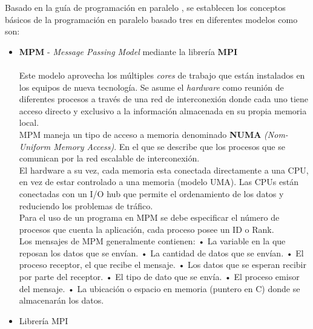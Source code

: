 Basado en la guía de programación en paralelo \cite{acosta2012guia}, se establecen los conceptos básicos de la programación en paralelo basado tres en diferentes modelos como son:

\begin{itemize}
	\item \textbf{MPM} - \textit{Message Passing Model} mediante la librería \textbf{MPI}
	\\\\
	Este modelo aprovecha los múltiples \textit{cores} de trabajo que están instalados en los equipos de nueva tecnología. Se asume el \textit{hardware} como reunión de diferentes procesos a través de una red de interconexión donde cada uno tiene acceso directo y exclusivo a la información almacenada en su propia memoria local.\\
	
	MPM maneja un tipo de acceso a memoria denominado \textbf{NUMA} \textit{(Nom-Uniform Memory Access)}. En el que se describe que los procesos que se comunican por la red escalable de interconexión.\\
	El hardware a su vez, cada memoria esta conectada directamente a una CPU, en vez de estar controlado a una memoria (modelo UMA). Las CPUs están conectadas con un I/O hub que permite el ordenamiento de los datos y reduciendo los problemas de tráfico.\\
	Para el uso de un programa en MPM se debe especificar el número de procesos que cuenta la aplicación, cada proceso posee un ID o Rank.\\

	Los mensajes de MPM generalmente contienen:
		\subitem •	 La variable en la que reposan los datos que se envían.
		\subitem •	 La cantidad de datos que se envían.
		\subitem •	 El proceso receptor, el que recibe el mensaje.
		\subitem •	 Los datos que se esperan recibir por parte del receptor.
		\subitem •	 El tipo de dato que se envía.
		\subitem •	 El proceso emisor del mensaje.
		\subitem •	 La ubicación o espacio en memoria (puntero en C) donde se almacenarán los datos.\\
       
	\item Librería MPI


\end{itemize}
